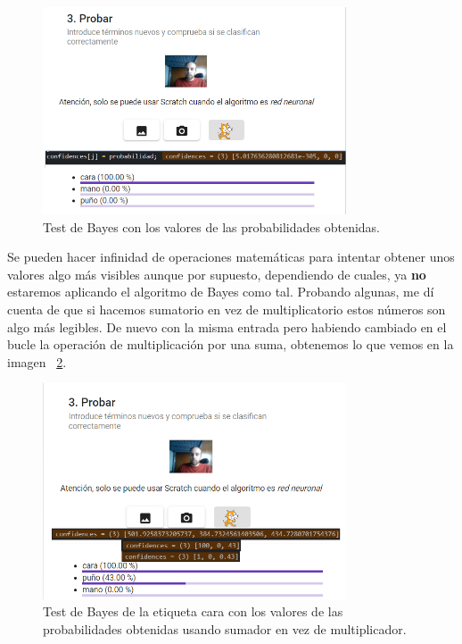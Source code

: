 \documentclass[a4paper, 12pt]{book}
\begin{document}
\begin{figure}
	\centering
	\includegraphics[width=9cm, keepaspectratio]{img/bayestestcara}
	\caption{Test de Bayes con los valores de las probabilidades obtenidas.}			
	\label{fig:bayestestcara}
\end{figure}

Se pueden hacer infinidad de operaciones matemáticas para intentar obtener unos valores algo más visibles aunque por supuesto, dependiendo de cuales, ya \textbf{no} estaremos aplicando el algoritmo de Bayes como tal. Probando algunas, me dí cuenta de que si hacemos sumatorio en vez de multiplicatorio estos números son algo más legibles. De nuevo con la misma entrada pero habiendo cambiado en el bucle la operación de multiplicación por una suma, obtenemos lo que vemos en la imagen ~\ref{fig:bayestestcarasuma}.

\begin{figure}
	\centering
	\includegraphics[width=9cm, keepaspectratio]{img/bayestestcarasuma}
	\caption{Test de Bayes de la etiqueta cara con los valores de las probabilidades obtenidas usando sumador en vez de multiplicador.}			
	\label{fig:bayestestcarasuma}
\end{figure}
\end{document}
